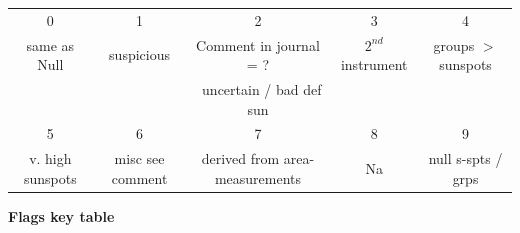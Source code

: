 \documentclass[12pt]{article}
\begin{document}
{\centering
    \begin{tabular}{c|c|c|c|c}\label{table:flags key}
        0 & 1 & 2 & 3 & 4 \\
        same as Null & suspicious & Comment in journal = ? & $2^{nd}$ instrument & groups $>$ sunspots\\
        && $~$ uncertain / bad def sun && \\
        \hline
        5 & 6 & 7 & 8 & 9\\
        v. high sunspots & misc see comment & derived from area-measurements & Na & null s-spts / grps
         
    \end{tabular}
    \caption{\textbf{Flags key table}}
    \label{tab:flag}
\par}\\
\end{document}
